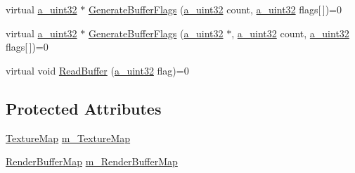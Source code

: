 \begin{DoxyCompactItemize}
\item 
virtual \hyperlink{_common_defines_8h_a964296f9770051b9e4807b1f180dd416}{a\+\_\+uint32} $\ast$ \hyperlink{class_agmd_1_1_frame_buffer_a4e08d994af258b09858b46e5b6ef47ed}{Generate\+Buffer\+Flags} (\hyperlink{_common_defines_8h_a964296f9770051b9e4807b1f180dd416}{a\+\_\+uint32} count, \hyperlink{_common_defines_8h_a964296f9770051b9e4807b1f180dd416}{a\+\_\+uint32} flags\mbox{[}$\,$\mbox{]})=0
\item 
virtual \hyperlink{_common_defines_8h_a964296f9770051b9e4807b1f180dd416}{a\+\_\+uint32} $\ast$ \hyperlink{class_agmd_1_1_frame_buffer_a797b28669a491bff2b4daa0e4ff3fa49}{Generate\+Buffer\+Flags} (\hyperlink{_common_defines_8h_a964296f9770051b9e4807b1f180dd416}{a\+\_\+uint32} $\ast$, \hyperlink{_common_defines_8h_a964296f9770051b9e4807b1f180dd416}{a\+\_\+uint32} count, \hyperlink{_common_defines_8h_a964296f9770051b9e4807b1f180dd416}{a\+\_\+uint32} flags\mbox{[}$\,$\mbox{]})=0
\item 
virtual void \hyperlink{class_agmd_1_1_frame_buffer_a1425626719ded4e216ecf6c9667151eb}{Read\+Buffer} (\hyperlink{_common_defines_8h_a964296f9770051b9e4807b1f180dd416}{a\+\_\+uint32} flag)=0
\end{DoxyCompactItemize}
\subsection*{Protected Attributes}
\begin{DoxyCompactItemize}
\item 
\hyperlink{namespace_agmd_aee41a562679bc3f0f62073c46a692c4c}{Texture\+Map} \hyperlink{class_agmd_1_1_frame_buffer_a5a14e4858f1ddf4b213ec903d90b35ef}{m\+\_\+\+Texture\+Map}
\item 
\hyperlink{namespace_agmd_a6e9a7cfb1414faf52f6290cf604872a9}{Render\+Buffer\+Map} \hyperlink{class_agmd_1_1_frame_buffer_aae5914f57aa6d790bd89df6e016b2f04}{m\+\_\+\+Render\+Buffer\+Map}
\end{DoxyCompactItemize}


